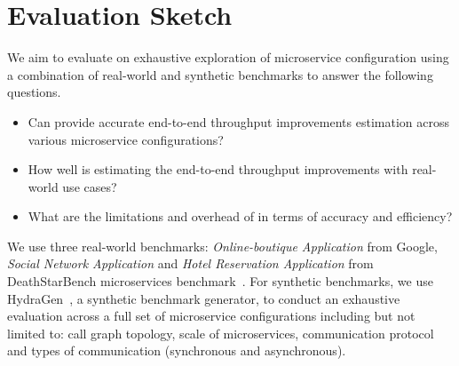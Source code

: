 \section{Evaluation Sketch}
We aim to evaluate \ours on exhaustive exploration of microservice configuration using a combination of real-world and synthetic benchmarks to answer the following questions.
\begin{itemize}
\item Can \ours provide accurate end-to-end throughput improvements estimation across various microservice configurations?
\item How well is \ours estimating the end-to-end throughput improvements with real-world use cases?
\item What are the limitations and overhead of \ours in terms of accuracy and efficiency?
\end{itemize}
We use three real-world benchmarks: \emph{Online-boutique Application} from Google, \emph{Social Network Application} and \emph{Hotel Reservation Application} from DeathStarBench microservices benchmark~\cite{dsb}.
For synthetic benchmarks, we use HydraGen~\cite{hydragen}, a synthetic benchmark generator, to conduct an exhaustive evaluation across a full set of microservice configurations including but not limited to: call graph topology, scale of microservices, 
communication protocol and types of communication (synchronous and asynchronous). 



